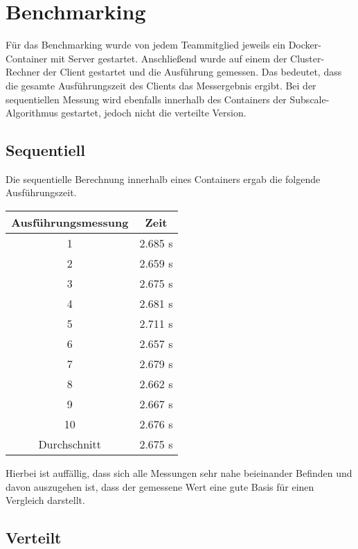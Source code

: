 \section{Benchmarking}

Für das Benchmarking wurde von jedem Teammitglied jeweils ein Docker-Container mit Server gestartet. Anschließend wurde auf einem der Cluster-Rechner der Client gestartet und die Ausführung gemessen. Das bedeutet, dass die gesamte Ausführungszeit des Clients das Messergebnis ergibt. Bei der sequentiellen Messung wird ebenfalls innerhalb des Containers der Subscale-Algorithmus gestartet, jedoch nicht die verteilte Version.

\subsection{Sequentiell}

Die sequentielle Berechnung innerhalb eines Containers ergab die folgende Ausführungszeit.

\begin{center}
    \begin{tabular}{ |c|c| }
        \hline
        Ausführungsmessung & Zeit    \\
        \hline
        1                  & 2.685 s \\
        2                  & 2.659 s \\
        3                  & 2.675 s \\
        4                  & 2.681 s \\
        5                  & 2.711 s \\
        6                  & 2.657 s \\
        7                  & 2.679 s \\
        8                  & 2.662 s \\
        9                  & 2.667 s \\
        10                 & 2.676 s \\
        \hline
        Durchschnitt       & 2.675 s \\
        \hline
    \end{tabular}
\end{center}

Hierbei ist auffällig, dass sich alle Messungen sehr nahe beieinander Befinden und davon auszugehen ist, dass der gemessene Wert eine gute Basis für einen Vergleich darstellt.

\subsection{Verteilt}

